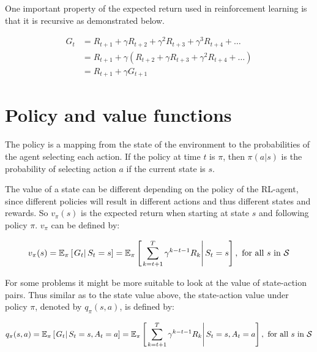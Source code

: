 One important property of the expected return used in reinforcement learning is that it is recursive as demonstrated below.

\begin{equation}
  \begin{aligned}
    G_t &= R_{t+1} + \gamma R_{t+2} + \gamma^2 R_{t+3} + \gamma^3 R_{t+4} + \ldots\\ 
        &= R_{t+1} + \gamma\left(R_{t+2} + \gamma R_{t+3} + \gamma^2 R_{t+4} + \ldots  \right )\\ 
        &= R_{t+1} + \gamma G_{t+1}
   \end{aligned}
\end{equation}

\section{Policy and value functions}
The policy is a mapping from the state of the environment to the probabilities of the agent selecting each action. If the policy at time $t$ is $\pi$, then $\pi(a|s)$ is the probability of selecting action $a$ if the current state is $s$.

The value of a state can be different depending on the policy of the RL-agent, since different policies will result in different actions and thus different states and rewards. So $v_\pi(s)$ is the expected return when starting at state $s$ and following policy $\pi$. $v_\pi$ can be defined by:

\begin{equation}
  v_\pi(s) = \mathbb{E}_\pi \left [ \left. G_t \right| S_t=s \right ] = \mathbb{E}_\pi \left [ \left. \sum_{k=t+1}^{T}\gamma^{k-t-1}R_{k} \right| S_t=s \right ], \textup{ for all } s \textup{ in } \mathcal{S}
  \label{eq:vpi}
\end{equation}

For some problems it might be more suitable to look at the value of state-action pairs. Thus similar as to the state value above, the state-action value under policy $\pi$, denoted by $q_\pi(s, a)$, is defined by:

\begin{equation}
  q_\pi(s, a) = \mathbb{E}_\pi \left [ \left. G_t \right| S_t=s, A_t=a \right ] = \mathbb{E}_\pi \left [ \left. \sum_{k=t+1}^{T}\gamma^{k-t-1}R_{k} \right| S_t=s, A_t=a  \right ], \textup{ for all } s \textup{ in } \mathcal{S}
\end{equation}


